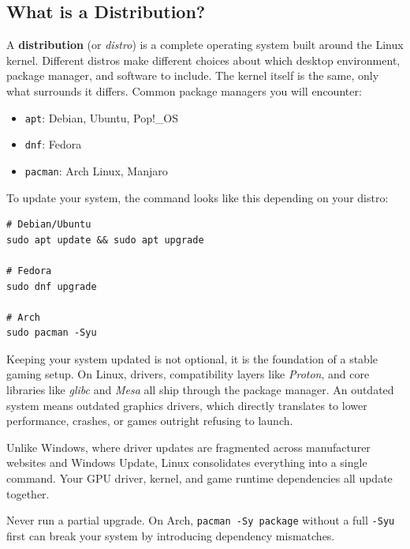 \documentclass{article}
\newcommand{\code}[1]{\colorbox{codebg}{\texttt{#1}}}
\begin{document}
\subsection{What is a Distribution?}

A \textbf{distribution} (or \textit{distro}) is a complete operating system built around the Linux kernel. Different distros make different choices about which desktop environment, package manager, and software to include. The kernel itself is the same, only what surrounds it differs. Common package managers you will encounter:

\begin{itemize}[leftmargin=1.5em, nosep, label={\tiny\textbullet}]
  \item \code{apt}: Debian, Ubuntu, Pop!\_OS
  \item \code{dnf}: Fedora
  \item \code{pacman}: Arch Linux, Manjaro
\end{itemize}

\noindent To update your system, the command looks like this depending on your distro:

\begin{verbatim}
# Debian/Ubuntu
sudo apt update && sudo apt upgrade

# Fedora
sudo dnf upgrade

# Arch
sudo pacman -Syu

\end{verbatim}

\noindent Keeping your system updated is not optional, it is the foundation of a stable gaming setup. On Linux, drivers, compatibility layers like \textit{Proton}, and core libraries like \textit{glibc} and \textit{Mesa} all ship through the package manager. An outdated system means outdated graphics drivers, which directly translates to lower performance, crashes, or games outright refusing to launch.

Unlike Windows, where driver updates are fragmented across manufacturer websites and Windows Update, Linux consolidates everything into a single command. Your GPU driver, kernel, and game runtime dependencies all update together.

\begin{tcolorbox}[arc=12pt, outer arc=10pt, colback=red!5!white, colframe=red!60!black, title=\textbf{Warning}]
Never run a partial upgrade. On Arch, \code{pacman -Sy package} without a full \code{-Syu} first can break your system by introducing dependency mismatches.
\end{tcolorbox}
\end{document}
